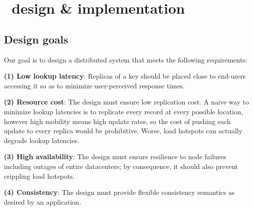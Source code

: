 \vsp
\section{ \auspice\ design \& implementation}
\label{sec:design}



\subsection{Design goals}
\label{sec:design_goals}

Our goal is to design a distributed system that meets the following requirements:

{\bf (1) Low lookup latency}: Replicas of a key should be placed close to end-users accessing it so as to minimize user-perceived response times.



{\bf (2) Resource cost}: The design must ensure low replication cost. A naive way to minimize lookup latencies is to replicate every record at every possible location, however high mobility means high update rates, so the cost of pushing each update to every replica would be prohibitive. Worse, load hotspots can actually degrade lookup latencies.

{\bf (3) High availability}: The design must ensure resilience to node failures including outages of entire datacenters; by consequence, it should also prevent crippling load hotspots.

{\bf (4) Consistency}: The design must provide flexible consistency semantics as desired by an application.



